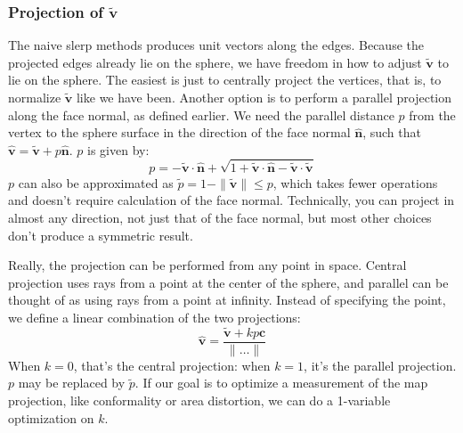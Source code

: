 \documentclass{amsart}[12pt]
\begin{document}
\subsubsection{Projection of $\widetilde{\mathbf v}$}
The naive slerp methods produces unit vectors along the edges. Because the
projected edges already lie on the sphere, we have freedom in how to adjust
$\widetilde{\mathbf v}$ to lie on the sphere. The easiest is just to centrally
project the vertices, that is, to normalize $\widetilde{\mathbf v}$ like we
have been. Another option is to perform a parallel projection along the
face normal, as defined earlier. We need the parallel distance $p$ from the
vertex to the sphere surface in the direction of the face normal
$\hat{\mathbf n}$, such that $\hat{\mathbf v} =
\widetilde{\mathbf v} + p\hat{\mathbf n}$. $p$ is given by:
\begin{equation}
   p = -\widetilde{\mathbf v} \cdot \hat{\mathbf n} +
   \sqrt{1+\widetilde{\mathbf v} \cdot \hat{\mathbf n}-\widetilde{\mathbf v} \cdot \widetilde{\mathbf v}}
\end{equation}
$p$ can also be approximated as $\widetilde{p} = 1 - \|\widetilde{\mathbf v}\|
\leq p$, which takes fewer operations and doesn't require
calculation of the face normal. Technically, you can project in almost any
direction, not just that of the face normal, but most other choices don't
produce a symmetric result.

Really, the projection can be performed from any point in space. Central
projection uses rays from a point at the center of the sphere, and parallel can
be thought of as using rays from a point at infinity. Instead of specifying the
point, we define a linear combination of the two projections:
\begin{equation}
  \hat{\mathbf v} = \frac{\widetilde{\mathbf v} + kp\mathbf c}{\|\dots\|}
\end{equation}
When $k=0$, that's the central projection: when $k=1$, it's the parallel
projection. $p$ may be replaced by $\widetilde{p}$. If our goal is to optimize
a measurement of the map projection, like conformality or area distortion, we
can do a 1-variable optimization on $k$.
\end{document}
